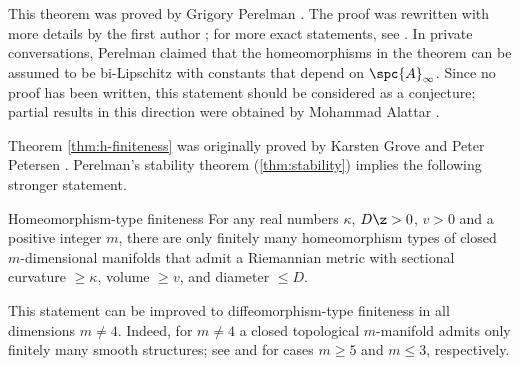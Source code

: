 This theorem was proved by Grigory Perelman \cite{perelman1991}.
The proof was rewritten with more details by the first author \cite{kapovitch};
for more exact statements, see \cite{kapovitch2002,kapovitch2005}.
In private conversations, Perelman claimed that the homeomorphisms in the theorem can be assumed to be bi-Lipschitz with constants that depend on $\spc{A}_\infty$.
Since no proof has been written, this statement should be considered as a conjecture;
partial results in this direction were obtained by Mohammad Alattar \cite{alattar}.

Theorem \ref{thm:h-finiteness} was originally proved by Karsten Grove and Peter Petersen \cite{grove-petersen1988}.
Perelman's stability theorem (\ref{thm:stability}) implies the following stronger statement.

\begin{thm}{Homeomorphism-type finiteness}
For any real numbers $\kappa$, $D\z>0$, $v>0$ and a positive integer $m$, there are only finitely many homeomorphism types of closed $m$-dimensional manifolds that admit a Riemannian metric with sectional curvature $\ge \kappa$, volume $\ge v$, and diameter $\le D$.
\end{thm}

This statement can be improved to diffeomorphism-type finiteness in all dimensions $m\ne 4$.
Indeed, for $m\ne4$ a closed topological $m$-manifold admits only finitely many smooth structures; see \cite{kirby-siebenmann} and \cite{moise,thurston} for cases $m\ge 5$ and $m\le 3$, respectively.


